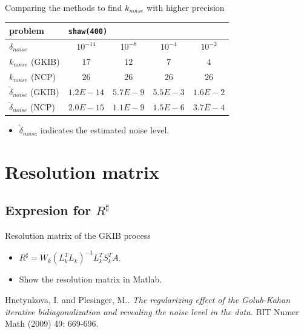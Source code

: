\documentclass{beamer}
\begin{document}
\begin{frame}{Comparing the methods to find $k_{noise}$ with higher precision}
  \begin{center}
    \begin{tabular}{l||c|c|c|c}
      \multicolumn{1}{l||}{problem} & \multicolumn{4}{l}{\texttt{shaw(400)}} \\
      \hline \hline 
      $\delta_{noise}$ & $10^{-14}$ & $10^{-8}$ & $10^{-4}$ & $10^{-2}$ \\
      \hline
      $k_{noise}$ (GKIB) & $17$ & $12$ & $7$ & $4$ \\
      \hline
      $k_{noise}$ (NCP) & $26$ & $26$ & $26$ & $26$ \\
      \hline
      $\tilde{\delta}_{noise}$ (GKIB) & $1.2E-14$ & $5.7E-9$ & $5.5E-3$ &
      $1.6E-2$ \\
      \hline
      $\tilde{\delta}_{noise}$ (NCP) & $2.0E-15$ & $1.1E-9$ & $1.5E-6$ & 
      $3.7E-4$ \\
    \end{tabular}
  \end{center}
  \begin{itemize}
    \item $\tilde{\delta}_{noise}$ indicates the estimated noise level.
    \end{itemize}
\end{frame}



\section{Resolution matrix}
\subsection{Expresion for $R^{\sharp}$}
\begin{frame}{Resolution matrix of the GKIB process}
  \begin{itemize}
    \item $R^{\sharp} = W_{k}(L_{k}^{T}L_{k})^{-1}L_{k}^{T}S_{k}^{T}A$.
    \item Show the resolution matrix in Matlab.
    \end{itemize}
\end{frame}

\begin{thebibliography}{1}
    Hnetynkova, I. and Plesinger, M.. 
    \emph{The regularizing effect of the Golub-Kahan iterative bidiagonalization 
      and revealing the noise level in the data.}
      BIT Numer Math (2009) 49: 669-696.
\end{thebibliography}
\end{document}
